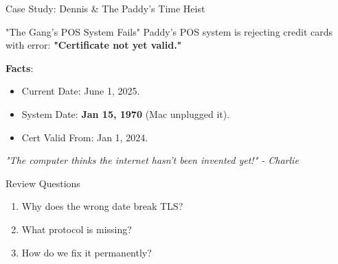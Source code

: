 \documentclass[aspectratio=169]{beamer}  %
\begin{document}
\begin{frame}{Case Study: Dennis \& The Paddy's Time Heist}
    \begin{casestudy}{"The Gang's POS System Fails"}
        \small
        Paddy's POS system is rejecting credit cards with error: \textbf{"Certificate not yet valid."}
        
        \vspace{0.2em}
        \textbf{Facts}:
        \begin{itemize} \footnotesize
            \item Current Date: June 1, 2025.
            \item System Date: \textbf{Jan 15, 1970} (Mac unplugged it).
            \item Cert Valid From: Jan 1, 2024.
        \end{itemize}
        
        \vspace{0.2em}
        \textit{"The computer thinks the internet hasn't been invented yet!" - Charlie}
    \end{casestudy}
    
    \begin{block}{Review Questions}
        \small
        \begin{enumerate}
            \item Why does the wrong date break TLS?
            \item What protocol is missing?
            \item How do we fix it permanently?
        \end{enumerate}
    \end{block}
\end{frame}
\end{document}
